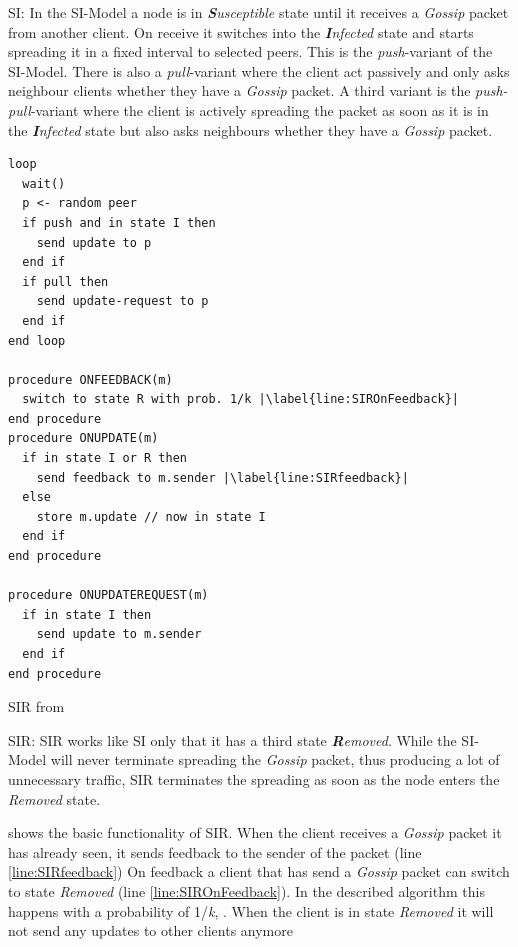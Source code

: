 SI:
In the SI-Model a node is in \textit{\textbf{S}usceptible} state until it receives a \textit{Gossip} packet from another client. On receive it switches into the \textit{\textbf{I}nfected} state and starts spreading it in a fixed interval to selected peers. This is the \textit{push}-variant of the SI-Model. There is also a \textit{pull}-variant where the client act passively and only asks neighbour clients whether they have a \textit{Gossip} packet. A third variant is the \textit{push-pull}-variant where the client is actively spreading the packet as soon as it is in the \textit{\textbf{I}nfected} state but also asks neighbours whether they have a \textit{Gossip} packet.  
\begin{Listing}
\begin{lstlisting}[multicols=2,basicstyle=\tiny,basicstyle=\footnotesize\ttfamily,xleftmargin=3em]
loop
  wait()
  p <- random peer
  if push and in state I then
    send update to p
  end if
  if pull then
    send update-request to p
  end if
end loop

procedure ONFEEDBACK(m)
  switch to state R with prob. 1/k |\label{line:SIROnFeedback}|
end procedure
procedure ONUPDATE(m)
  if in state I or R then
    send feedback to m.sender |\label{line:SIRfeedback}|
  else
    store m.update // now in state I
  end if
end procedure

procedure ONUPDATEREQUEST(m)
  if in state I then
    send update to m.sender
  end if
end procedure
\end{lstlisting}
\caption{SIR from \cite[\S1.2.2.2]{Jelasity2011}}
\label{lst:SIRAlgo}
\end{Listing}

SIR:
SIR works like SI only that it has a third state \textit{\textbf{R}emoved}. While the SI-Model will never terminate spreading the \textit{Gossip} packet, thus producing a lot of unnecessary traffic, SIR terminates the spreading as soon as the node enters the \textit{Removed} state.

 shows the basic functionality of SIR. 
When the client receives a \textit{Gossip} packet it has already seen, it sends feedback to the sender of the packet (line \ref{line:SIRfeedback})
On feedback a client that has send a \textit{Gossip} packet can switch to state \textit{Removed} (line \ref{line:SIROnFeedback}). In the described algorithm this happens with a probability of 1/\textit{k}, \cite[\S1.2.2.2]{Jelasity2011}. When the client is in state \textit{Removed} it will not send any updates to other clients anymore

